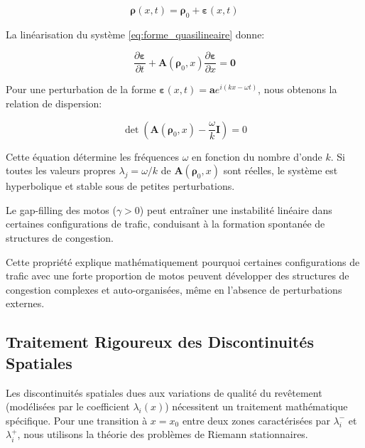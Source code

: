 \begin{equation}
\boldsymbol{\rho}(x,t) = \boldsymbol{\rho}_0 + \boldsymbol{\varepsilon}(x,t)
\end{equation}

La linéarisation du système \eqref{eq:forme_quasilineaire} donne:

\begin{equation}
\frac{\partial \boldsymbol{\varepsilon}}{\partial t} + \mathbf{A}(\boldsymbol{\rho}_0, x) \frac{\partial \boldsymbol{\varepsilon}}{\partial x} = \mathbf{0}
\end{equation}

Pour une perturbation de la forme $\boldsymbol{\varepsilon}(x,t) = \boldsymbol{a} e^{i(kx-\omega t)}$, nous obtenons la relation de dispersion:

\begin{equation}
\det(\mathbf{A}(\boldsymbol{\rho}_0, x) - \frac{\omega}{k}\mathbf{I}) = 0
\end{equation}

Cette équation détermine les fréquences $\omega$ en fonction du nombre d'onde $k$. Si toutes les valeurs propres $\lambda_j = \omega/k$ de $\mathbf{A}(\boldsymbol{\rho}_0, x)$ sont réelles, le système est hyperbolique et stable sous de petites perturbations.

\begin{proposition}
Le gap-filling des motos ($\gamma > 0$) peut entraîner une instabilité linéaire dans certaines configurations de trafic, conduisant à la formation spontanée de structures de congestion.
\end{proposition}

Cette propriété explique mathématiquement pourquoi certaines configurations de trafic avec une forte proportion de motos peuvent développer des structures de congestion complexes et auto-organisées, même en l'absence de perturbations externes.

\subsection{Traitement Rigoureux des Discontinuités Spatiales}
\label{subsec:traitement_discontinuites}

Les discontinuités spatiales dues aux variations de qualité du revêtement (modélisées par le coefficient $\lambda_i(x)$) nécessitent un traitement mathématique spécifique. Pour une transition à $x = x_0$ entre deux zones caractérisées par $\lambda_i^-$ et $\lambda_i^+$, nous utilisons la théorie des problèmes de Riemann stationnaires.

